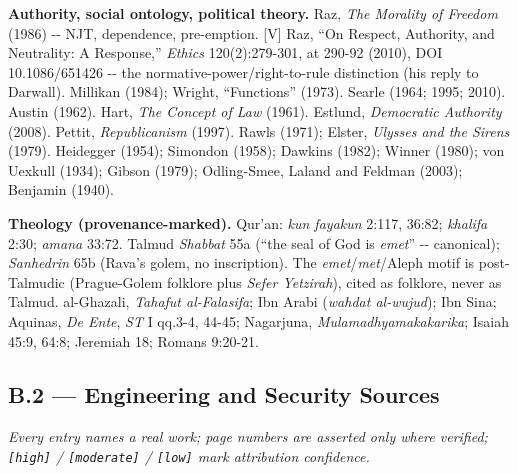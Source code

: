 \documentclass[11pt]{article}
\begin{document}
\textbf{Authority, social ontology, political theory.} Raz, \emph{The Morality of Freedom} (1986) -{}- NJT, dependence, pre-emption. [V] Raz, ``On Respect, Authority, and Neutrality: A Response,'' \emph{Ethics} 120(2):279-301, at 290-92 (2010), DOI 10.1086/\allowbreak{}651426 -{}- the normative-power/\allowbreak{}right-to-rule distinction (his reply to Darwall). Millikan (1984); Wright, ``Functions'' (1973). Searle (1964; 1995; 2010). Austin (1962). Hart, \emph{The Concept of Law} (1961). Estlund, \emph{Democratic Authority} (2008). Pettit, \emph{Republicanism} (1997). Rawls (1971); Elster, \emph{Ulysses and the Sirens} (1979). Heidegger (1954); Simondon (1958); Dawkins (1982); Winner (1980); von Uexkull (1934); Gibson (1979); Odling-Smee, Laland and Feldman (2003); Benjamin (1940).

\textbf{Theology (provenance-marked).} Qur'an: \emph{kun fayakun} 2:117, 36:82; \emph{khalifa} 2:30; \emph{amana} 33:72. Talmud \emph{Shabbat} 55a (``the seal of God is \emph{emet}'' -{}- canonical); \emph{Sanhedrin} 65b (Rava's golem, no inscription). The \emph{emet}/\allowbreak{}\emph{met}/\allowbreak{}Aleph motif is post-Talmudic (Prague-Golem folklore plus \emph{Sefer Yetzirah}), cited as folklore, never as Talmud. al-Ghazali, \emph{Tahafut al-Falasifa}; Ibn Arabi (\emph{wahdat al-wujud}); Ibn Sina; Aquinas, \emph{De Ente}, \emph{ST} I qq.3-4, 44-45; Nagarjuna, \emph{Mulamadhyamakakarika}; Isaiah 45:9, 64:8; Jeremiah 18; Romans 9:20-21.

\subsection*{B.2 — Engineering and Security Sources}

\emph{Every entry names a real work; page numbers are asserted only where verified; \texttt{[high]} /\allowbreak{} \texttt{[moderate]} /\allowbreak{} \texttt{[low]} mark attribution confidence.}
\end{document}
